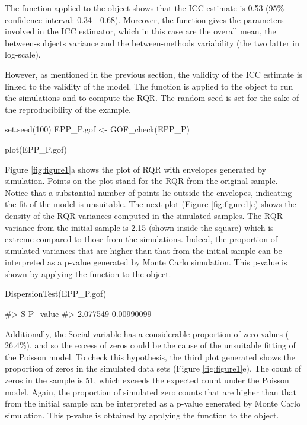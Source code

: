 The function  applied to the  object shows that the
ICC estimate is 0.53 (95\% confidence interval: 0.34 - 0.68). Moreover,
the function  gives the parameters involved in the ICC
estimator, which in this case are the overall mean, the between-subjects
variance and the between-methods variability (the two latter in
log-scale).

However, as mentioned in the previous section, the validity of the ICC
estimate is linked to the validity of the model. The function
 is applied to the  object to run the
simulations and to compute the RQR. The random seed is set for the sake
of the reproducibility of the example.

\begin{Schunk}
\begin{Sinput}
set.seed(100)
EPP_P.gof <- GOF_check(EPP_P)
\end{Sinput}
\end{Schunk}

\begin{Schunk}
\begin{Sinput}
plot(EPP_P.gof)
\end{Sinput}
\end{Schunk}

Figure \ref{fig:figure1}a shows the plot of RQR with envelopes generated
by simulation. Points on the plot stand for the RQR from the original
sample. Notice that a substantial number of points lie outside the
envelopes, indicating the fit of the model is unsuitable. The next plot
(Figure \ref{fig:figure1}c) shows the density of the RQR variances
computed in the simulated samples. The RQR variance from the initial
sample is 2.15 (shown inside the square) which is extreme compared to
those from the simulations. Indeed, the proportion of simulated
variances that are higher than that from the initial sample can be
interpreted as a p-value generated by Monte Carlo simulation. This
p-value is shown by applying the function  to the
 object.

\begin{Schunk}
\begin{Sinput}
DispersionTest(EPP_P.gof)
\end{Sinput}
\begin{Soutput}
#>         S    P_value
#>  2.077549 0.00990099
\end{Soutput}
\end{Schunk}

Additionally, the Social variable has a considerable proportion of zero
values (\(26.4\%\)), and so the excess of zeros could be the cause of
the unsuitable fitting of the Poisson model. To check this hypothesis,
the third plot generated shows the proportion of zeros in the simulated
data sets (Figure \ref{fig:figure1}e). The count of zeros in the sample
is 51, which exceeds the expected count under the Poisson model. Again,
the proportion of simulated zero counts that are higher than that from
the initial sample can be interpreted as a p-value generated by Monte
Carlo simulation. This p-value is obtained by applying the function
 to the  object.

